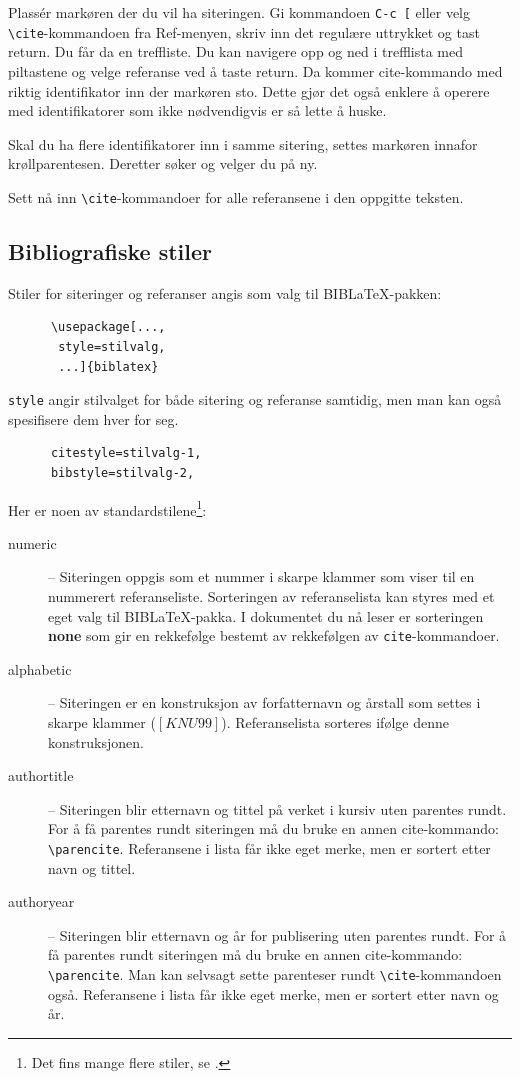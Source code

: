 \documentclass[11pt,norsk,a4paper]{article}
\newcommand{\kdo}[1]{\texttt{#1}}
\newcommand{\blt}{B{\smaller[2]IB}\discretionary{-}{}{\kern
    -0.12em}\LaTeX{}}
\begin{document}
Plassér markøren der du vil ha siteringen. Gi kommandoen
\verb=C-c [= eller velg \verb/\cite/-kommandoen fra Ref-menyen,
skriv inn det regulære uttrykket og tast return. Du får da
 en treffliste. Du kan navigere opp og ned i trefflista med
piltastene og velge referanse ved å taste return. Da kommer
cite-kommando med riktig identifikator inn der markøren sto. Dette
gjør det også enklere å operere med identifikatorer som ikke
nødvendigvis er så lette å huske.

Skal du ha flere identifikatorer inn i samme sitering, settes markøren
innafor krøllparentesen. Deretter søker og velger du på ny.

Sett nå inn \verb=\cite=-kommandoer for alle referansene i den
oppgitte teksten.

\subsection{Bibliografiske stiler}
Stiler for siteringer og referanser angis som valg til
\blt-pakken:

{\footnotesize\begin{verbatim}
      \usepackage[...,
       style=stilvalg,
       ...]{biblatex}
\end{verbatim}}

\kdo{style} angir stilvalget for både sitering og referanse samtidig,
men man kan også spesifisere dem hver for seg.

{\footnotesize\begin{verbatim}
      citestyle=stilvalg-1,
      bibstyle=stilvalg-2,
\end{verbatim}}

Her er noen av standardstilene\footnote{Det fins mange flere stiler,
  se \cite[][65-70]{biblatex}.}:

\begin{description}
\item[numeric] -- Siteringen oppgis som et nummer i skarpe
klammer som viser til en nummerert referanseliste. Sorteringen av
referanselista kan styres med et eget valg til \blt-pakka. I 
dokumentet du nå leser er sorteringen \textbf{none} som gir en rekkefølge
bestemt av rekkefølgen av \kdo{cite}-kommandoer.

\item[alphabetic] -- Siteringen er en konstruksjon av
forfatternavn og årstall som settes i
skarpe klammer ($[KNU99]$). Referanselista sorteres ifølge denne konstruksjonen.

\item[authortitle] --  Siteringen blir etternavn og tittel på
verket i kursiv uten parentes rundt. For å få parentes rundt
siteringen må du bruke en annen cite-kommando:
\verb=\parencite=. Referansene i lista får ikke eget merke, men er
sortert etter navn og tittel.

\item[authoryear] -- Siteringen blir etternavn og år for publisering
  uten parentes rundt. For å få parentes rundt siteringen må du bruke
  en annen cite-kommando: \verb=\parencite=. Man kan selvsagt sette
  parenteser rundt \verb=\cite=-kommandoen også. Referansene i lista
  får ikke eget merke, men er sortert etter navn og år.
\end{description} 
\end{document}
